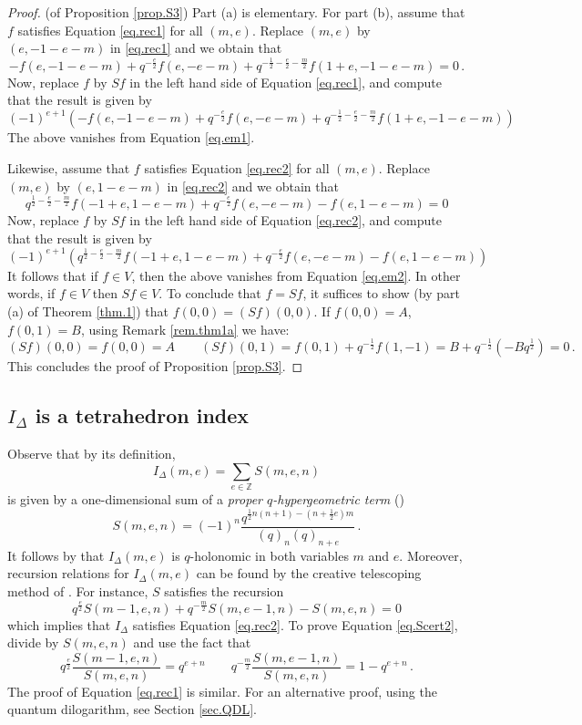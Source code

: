 \documentclass[12pt]{amsart}
\theoremstyle{definition}
\def\BZ{\mathbb Z}
\def\be{  \begin{equation} }
\def\ee{  \end{equation} }
\def\ID{I_{\Delta}}
\numberwithin{equation}{section}
\begin{document}
\begin{proof}(of Proposition \ref{prop.S3})
Part (a) is elementary. For part (b), assume that $f$ satisfies Equation 
\eqref{eq.rec1} for all $(m,e)$. Replace $(m,e)$ by $(e,-1-e-m)$ in
\eqref{eq.rec1} and we obtain that
\be
\label{eq.em1}
-f(e, -1 - e - m) + q^{-\frac{e}{2}} f(e, -e - m) + 
 q^{-\frac{1}{2} - \frac{e}{2} - \frac{m}{2}} f(1 + e, -1 - e - m)=0 \,.
\ee
Now, replace $f$ by $Sf$ in the left hand side of Equation \eqref{eq.rec1},
and compute that the result is given by 
$$
(-1)^{e+1}\left( -f(e, -1 - e - m) + q^{-\frac{e}{2}} f(e, -e - m) + 
 q^{-\frac{1}{2} - \frac{e}{2} - \frac{m}{2}} f(1 + e, -1 - e - m) \right)
$$ 
The above vanishes from Equation \eqref{eq.em1}.

Likewise, assume that $f$ satisfies Equation 
\eqref{eq.rec2} for all $(m,e)$. Replace $(m,e)$ by $(e,1-e-m)$ in
\eqref{eq.rec2} and we obtain that
\be
\label{eq.em2}
q^{\frac{1}{2} - \frac{e}{2} - \frac{m}{2}} f(-1 + e, 1 - e - m) 
+ q^{-\frac{e}{2}} f(e, -e - m) -  f(e, 1 - e - m)=0
\ee
Now, replace $f$ by $Sf$ in the left hand side of Equation \eqref{eq.rec2},
and compute that the result is given by 
$$
(-1)^{e+1}\left( q^{\frac{1}{2} - \frac{e}{2} - \frac{m}{2}} f(-1 + e, 1 - e - m) + q^{-\frac{e}{2}} f(e, -e - m) - 
 f(e, 1 - e - m) \right)
$$
It follows that if $f \in V$, then the above vanishes from Equation 
\eqref{eq.em2}. In other words, if $f \in V$ then $Sf \in V$. 
To conclude that $f=Sf$, it suffices 
to show (by part (a) of Theorem \ref{thm.1}) that $f(0,0)=(Sf)(0,0)$.
If $f(0,0)=A$, $f(0,1)=B$, using Remark \ref{rem.thm1a} we have:
$$
(Sf)(0,0)=f(0,0)=A \qquad (Sf)(0,1)=f(0,1)+q^{-\frac{1}{2}}f(1,-1)=
B + q^{-\frac{1}{2}} (- B q^{\frac{1}{2}})=0 \,.
$$
This concludes the proof of Proposition \ref{prop.S3}.
\end{proof}

\subsection{$\ID$ is a tetrahedron index}
\label{sub.isindex}

Observe that by its definition, 
$$
\ID(m,e)=\sum_{e \in \BZ} S(m,e,n) 
$$ 
is given by a one-dimensional sum of a {\em proper $q$-hypergeometric term}
(\cite{WZ,PWZ}) 
$$
S(m,e,n)=(-1)^n \frac{q^{\frac{1}{2}n(n+1)
-\left(n+\frac{1}{2}e\right)m}}{(q)_n(q)_{n+e}} \,.
$$
It follows by \cite{WZ} that $\ID(m,e)$ is $q$-holonomic in both variables
$m$ and $e$. Moreover, recursion relations for $\ID(m,e)$ can be found
by the creative telescoping method of \cite{WZ}. For instance, $S$
satisfies the recursion
\be
\label{eq.Scert2}
q^{\frac{e}{2}} S(m - 1, e, n)+ q^{-\frac{m}{2}} S(m, e - 1, n) -S(m,e,n)=0
\ee
which implies that $\ID$ satisfies Equation \eqref{eq.rec2}. To prove
Equation \eqref{eq.Scert2}, divide by $S(m,e,n)$ and use the fact that
$$
q^{\frac{e}{2}} \frac{S(m - 1, e, n)}{S(m,e,n)}=q^{e + n}
\qquad
 q^{-\frac{m}{2}} \frac{S(m, e - 1, n)}{S(m,e,n)}=1-q^{e + n} \,.
$$
The proof of Equation \eqref{eq.rec1} is similar. For an alternative
proof, using the quantum dilogarithm, see Section \ref{sec.QDL}.
\end{document}
